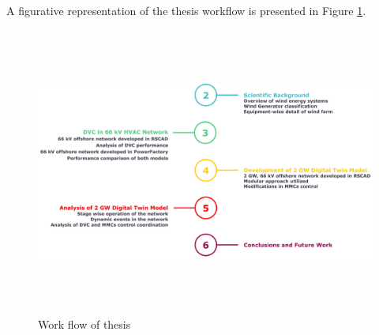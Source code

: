 A figurative representation of the thesis workflow is presented in Figure \ref{fig:Thesis_outline}.

\begin{figure}[H]
\centering
    \includegraphics[height = 9.5cm,width =\textwidth]{Diagrams/Chapter_1/Thesis_flowchart.pdf}
    \caption{Work flow of thesis}
    \label{fig:Thesis_outline}
\end{figure}
